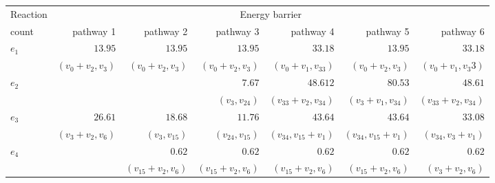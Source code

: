 \begin{table}[!h]
    \centering
    \vspace{0.5cm}
    \begin{footnotesize}
    \begin{adjustbox}{angle=90}
    \begin{tabular}{lrrrrrr}
        \toprule
        Reaction\hspace{0.2cm} & \multicolumn{6}{c}{Energy barrier} \\
        count & \hspace{0.5cm}\textcolor{myBlue}{pathway 1} & \hspace{0.5cm}\textcolor{myGreen}{pathway 2} & \hspace{0.5cm}\textcolor{myBrown}{pathway 3} & \hspace{0.5cm}\textcolor{myCyan}{pathway 4} & \hspace{0.5cm}\textcolor{myBlue2}{pathway 5} & \hspace{0.5cm}\textcolor{myRed}{pathway 6} \\
        \midrule
        \multirow{2}{*}{$e_1$} & $13.95$ & \cellcolor{mygray}$13.95$ & \cellcolor{mygray}$13.95$ & \cellcolor{mygray}$33.18$ & \cellcolor{mygray}$13.95$ & \cellcolor{mygray}$33.18$\\
        & $(v_0+v_2,v_3)$ & \cellcolor{mygray}$(v_0+v_2,v_3)$ & \cellcolor{mygray}$(v_0+v_2,v_3)$ & \cellcolor{mygray}$(v_0+v_1,v_{33})$ & \cellcolor{mygray}$(v_0+v_2,v_3)$ & \cellcolor{mygray}$(v_0+v_1,v_{3}3)$\\
        \multirow{2}{*}{$e_2$} & & & $7.67$ & $48.612$ & $80.53$ & \cellcolor{mygray}$48.61$\\
        & & & $(v_3, v_{24})$ & $(v_{33}+v_2, v_{34})$ & $(v_3+v_1, v_{34})$ & \cellcolor{mygray}$(v_{33}+v_2, v_{34})$\\
        \multirow{2}{*}{$e_3$} & $26.61$ & $18.68$ & $11.76$ & $43.64$ & \cellcolor{mygray}$43.64$ & $33.08$\\
        & $(v_3+v_2, v_6)$ & $(v_3, v_{15})$ & $(v_{24}, v_{15})$ & $(v_{34}, v_{15}+v_1)$ & \cellcolor{mygray}$(v_{34}, v_{15}+v_1)$ & $(v_{34}, v_3+v_1)$\\
        \multirow{2}{*}{$e_4$} & & $0.62$ & \cellcolor{mygray}$0.62$ & \cellcolor{mygray}$0.62$ & \cellcolor{mygray}$0.62$ & \cellcolor{mygray}$0.62$\\
        & & $(v_{15}+v_2,v_6)$ & \cellcolor{mygray}$(v_{15}+v_2,v_6)$ & \cellcolor{mygray}$(v_{15}+v_2,v_6)$ & \cellcolor{mygray}$(v_{15}+v_2,v_6)$ & \cellcolor{mygray}$(v_3+v_2,v_6)$\\

\end{tabular}
\end{adjustbox}
\end{footnotesize}
\end{table}
